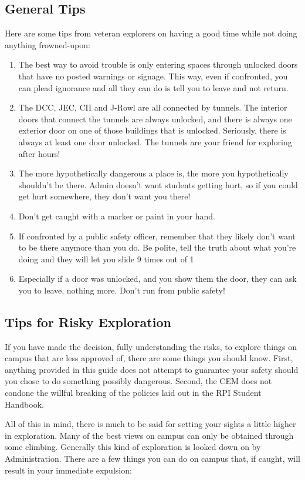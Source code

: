 \documentclass{article}
\begin{document}
  \subsection{General Tips}
  Here are some tips from veteran explorers on having a good time while not doing anything frowned-upon:
  \begin{enumerate}
    \item The best way to avoid trouble is only entering spaces through unlocked doors that have no posted warnings or signage. This way, even if confronted, you can plead ignorance and all they can do is tell you to leave and not return.
    \item The DCC, JEC, CII and J-Rowl are all connected by tunnels. The interior doors that connect the tunnels are always unlocked, and there is always one exterior door on one of those buildings that is unlocked. Seriously, there is always at least one door unlocked. The tunnels are your friend for exploring after hours!
    \item The more hypothetically dangerous a place is, the more you hypothetically shouldn’t be there. Admin doesn’t want students getting hurt, so if you could get hurt somewhere, they don’t want you there!
    \item Don’t get caught with a marker or paint in your hand.
    \item If confronted by a public safety officer, remember that they likely don’t want to be there anymore than you do. Be polite, tell the truth about what you’re doing and they will let you slide 9 times out of 1\item Especially if a door was unlocked, and you show them the door, they can ask you to leave, nothing more. Don’t run from public safety!
\end{enumerate}

      \subsection{Tips for Risky Exploration}
If you have made the decision, fully understanding the risks, to explore things on campus that are less approved of, there are some things you should know. First, anything provided in this guide does not attempt to guarantee your safety should you chose to do something possibly dangerous. Second, the CEM does not condone the willful breaking of the policies laid out in the RPI Student Handbook.

All of this in mind, there is much to be said for setting your sights a little higher in exploration. Many of the best views on campus can only be obtained through some climbing. Generally this kind of exploration is looked down on by Administration. There are a few things you can do on campus that, if caught, will result in your immediate expulsion:
\end{document}
